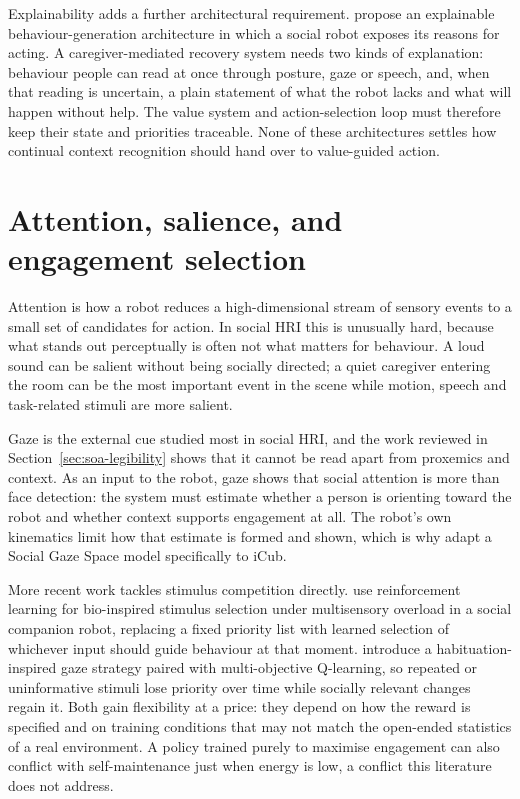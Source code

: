 Explainability adds a further architectural requirement. \citet{Stange2022SelfExplaining} propose an explainable behaviour-generation architecture in which a social robot exposes its reasons for acting. A caregiver-mediated recovery system needs two kinds of explanation: behaviour people can read at once through posture, gaze or speech, and, when that reading is uncertain, a plain statement of what the robot lacks and what will happen without help. The value system and action-selection loop must therefore keep their state and priorities traceable. None of these architectures settles how continual context recognition should hand over to value-guided action.

\section{Attention, salience, and engagement selection}
\label{sec:soa-attention}

Attention is how a robot reduces a high-dimensional stream of sensory events to a small set of candidates for action. In social HRI this is unusually hard, because what stands out perceptually is often not what matters for behaviour. A loud sound can be salient without being socially directed; a quiet caregiver entering the room can be the most important event in the scene while motion, speech and task-related stimuli are more salient.

Gaze is the external cue studied most in social HRI, and the work reviewed in Section~\ref{sec:soa-legibility} shows that it cannot be read apart from proxemics and context. As an input to the robot, gaze shows that social attention is more than face detection: the system must estimate whether a person is orienting toward the robot and whether context supports engagement at all. The robot's own kinematics limit how that estimate is formed and shown, which is why \citet{Shaghaghi2024SocialGazeSpace} adapt a Social Gaze Space model specifically to iCub.

More recent work tackles stimulus competition directly. \citet{GarciaMartinez2025BioinspiredStimulus} use reinforcement learning for bio-inspired stimulus selection under multisensory overload in a social companion robot, replacing a fixed priority list with learned selection of whichever input should guide behaviour at that moment. \citet{Ghamati2025LearningToGaze} introduce a habituation-inspired gaze strategy paired with multi-objective Q-learning, so repeated or uninformative stimuli lose priority over time while socially relevant changes regain it. Both gain flexibility at a price: they depend on how the reward is specified and on training conditions that may not match the open-ended statistics of a real environment. A policy trained purely to maximise engagement can also conflict with self-maintenance just when energy is low, a conflict this literature does not address.

